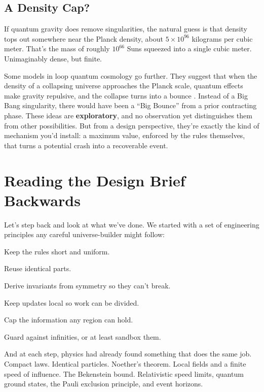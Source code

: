 \subsection{A Density Cap?}

If quantum gravity does remove singularities, the natural guess is that density tops out somewhere near the Planck density, about \(5 \times 10^{96}\) kilograms per cubic meter. That's the mass of roughly \(10^{66}\) Suns squeezed into a single cubic meter. Unimaginably dense, but finite.

Some models in loop quantum cosmology go further. They suggest that when the density of a collapsing universe approaches the Planck scale, quantum effects make gravity repulsive, and the collapse turns into a bounce \cite{ashtekar2006}. Instead of a Big Bang singularity, there would have been a ``Big Bounce'' from a prior contracting phase. These ideas are \textbf{exploratory}, and no observation yet distinguishes them from other possibilities. But from a design perspective, they're exactly the kind of mechanism you'd install: a maximum value, enforced by the rules themselves, that turns a potential crash into a recoverable event.

\section{Reading the Design Brief Backwards}

Let's step back and look at what we've done. We started with a set of engineering principles any careful universe-builder might follow:

\begin{compactchecklist}
\item Keep the rules short and uniform.
\item Reuse identical parts.
\item Derive invariants from symmetry so they can't break.
\item Keep updates local so work can be divided.
\item Cap the information any region can hold.
\item Guard against infinities, or at least sandbox them.
\end{compactchecklist}

And at each step, physics had already found something that does the same job. Compact laws. Identical particles. Noether's theorem. Local fields and a finite speed of influence. The Bekenstein bound. Relativistic speed limits, quantum ground states, the Pauli exclusion principle, and event horizons.

